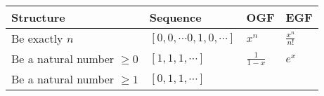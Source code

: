 \begin{longtable}[]{@{}llll@{}}
\toprule
\begin{minipage}[b]{0.22\columnwidth}\raggedright
Structure\strut
\end{minipage} & \begin{minipage}[b]{0.22\columnwidth}\raggedright
Sequence\strut
\end{minipage} & \begin{minipage}[b]{0.22\columnwidth}\raggedright
OGF\strut
\end{minipage} & \begin{minipage}[b]{0.22\columnwidth}\raggedright
EGF\strut
\end{minipage}\tabularnewline
\midrule
\endhead
\begin{minipage}[t]{0.22\columnwidth}\raggedright
Be exactly \(n\)\strut
\end{minipage} & \begin{minipage}[t]{0.22\columnwidth}\raggedright
\([0, 0, \cdots 0, 1, 0, \cdots]\)\strut
\end{minipage} & \begin{minipage}[t]{0.22\columnwidth}\raggedright
\(x^n\)\strut
\end{minipage} & \begin{minipage}[t]{0.22\columnwidth}\raggedright
\(\frac {x^n} {n!}\)\strut
\end{minipage}\tabularnewline
\begin{minipage}[t]{0.22\columnwidth}\raggedright
Be a natural number \(\geq 0\)\strut
\end{minipage} & \begin{minipage}[t]{0.22\columnwidth}\raggedright
\([1,1,1,\cdots]\)\strut
\end{minipage} & \begin{minipage}[t]{0.22\columnwidth}\raggedright
\(\frac 1 {1-x}\)\strut
\end{minipage} & \begin{minipage}[t]{0.22\columnwidth}\raggedright
\(e^x\)\strut
\end{minipage}\tabularnewline
\begin{minipage}[t]{0.22\columnwidth}\raggedright
Be a natural number \(\geq 1\)\strut
\end{minipage} & \begin{minipage}[t]{0.22\columnwidth}\raggedright
\([0,1,1,\cdots]\)\strut
\end{minipage} & \begin{minipage}[t]{0.22\columnwidth}\raggedright

\end{minipage}
\end{longtable}
